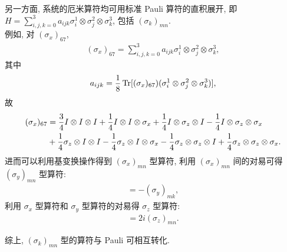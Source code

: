 \documentclass{assignment}
\begin{document}
\begin{sol}
    另一方面, 系统的厄米算符均可用标准 Pauli 算符的直积展开, 即 $H=\sum_{i,j,k=0}^3a_{ijk}\sigma_i^1\otimes\sigma_j^2\otimes\sigma_k^3$, 包括 $(\sigma_k)_{mn}$.\\
    例如, 对 $(\sigma_x)_{67}$,\\
    \begin{align}
        (\sigma_x)_{67}=\sum_{i,j,k=0}^3a_{ijk}\sigma_i^1\otimes\sigma_j^2\otimes\sigma_k^3,
    \end{align}
    其中
    \begin{align}
        a_{ijk}=\frac{1}{8}\operatorname{Tr}[(\sigma_x)_{67})(\sigma_i^1\otimes\sigma_j^2\otimes\sigma_k^3)],
    \end{align}
    故
    \begin{align}
        \notag(\sigma_x)_{67}&=\frac{3}{4}I\otimes I\otimes I+\frac{1}{4}I\otimes I\otimes\sigma_x+\frac{1}{4}I\otimes\sigma_z\otimes I-\frac{1}{4}I\otimes\sigma_z\otimes\sigma_x\\
        &+\frac{1}{4}\sigma_z\otimes I\otimes I-\frac{1}{4}\sigma_z\otimes I\otimes\sigma_x-\frac{1}{4}\sigma_z\otimes\sigma_z\otimes I+\frac{1}{4}\sigma_z\otimes\sigma_z\otimes\sigma_x.
    \end{align}
    进而可以利用基变换操作得到 $(\sigma_x)_{mn}$ 型算符, 利用 $(\sigma_x)_{mn}$ 间的对易可得 $(\sigma_y)_{mn}$ 型算符:
    \begin{align}
        [(\sigma_x)_{mn},(\sigma_x)_{nk}]=-(\sigma_y)_{mk},
    \end{align}
    利用 $\sigma_x$ 型算符和 $\sigma_y$ 型算符的对易得 $\sigma_z$ 型算符:
    \begin{align}
        [(\sigma_x)_{mn},(\sigma_y)_{mn}]=2i(\sigma_z)_{mn}.
    \end{align}

    综上, $(\sigma_k)_{mn}$ 型的算符与 Pauli 可相互转化.
\end{sol}
\end{document}
